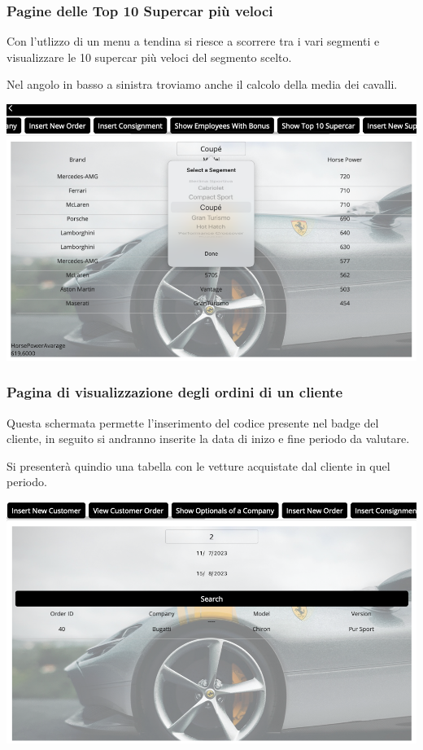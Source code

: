 \documentclass[11pt]{article}
\begin{document}
\subsubsection{Pagine delle Top 10 Supercar più veloci}
Con l'utlizzo di un menu a tendina si riesce a scorrere tra i vari segmenti
e visualizzare le 10 supercar più veloci del segmento scelto.

Nel angolo in basso a sinistra troviamo anche il calcolo della media dei
cavalli.
\begin{center}
    \includegraphics[width=\linewidth]{images/app/topTenSupercar.png}
\end{center}

\subsubsection{Pagina di visualizzazione degli ordini di un cliente}
Questa schermata permette l'inserimento del codice presente nel badge del cliente, 
in seguito si andranno inserite la data di inizo e fine periodo da valutare.

Si presenterà quindio una tabella con le vetture acquistate dal cliente in quel periodo.

\begin{center}
    \includegraphics[width=\linewidth]{images/app/showOrders.png}
\end{center}
\end{document}
